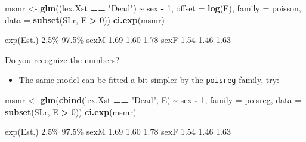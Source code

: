 \documentclass[
]{book}
\newenvironment{Shaded}{\begin{snugshade}}{\end{snugshade}}
\newcommand{\AttributeTok}[1]{\textcolor[rgb]{0.13,0.29,0.53}{#1}}
\newcommand{\DecValTok}[1]{\textcolor[rgb]{0.00,0.00,0.81}{#1}}
\newcommand{\FunctionTok}[1]{\textcolor[rgb]{0.13,0.29,0.53}{\textbf{#1}}}
\newcommand{\NormalTok}[1]{#1}
\newcommand{\OtherTok}[1]{\textcolor[rgb]{0.56,0.35,0.01}{#1}}
\newcommand{\SpecialCharTok}[1]{\textcolor[rgb]{0.81,0.36,0.00}{\textbf{#1}}}
\newcommand{\StringTok}[1]{\textcolor[rgb]{0.31,0.60,0.02}{#1}}
\providecommand{\tightlist}{%
  \setlength{\itemsep}{0pt}\setlength{\parskip}{0pt}}
\begin{document}
\begin{enumerate}
\begin{Shaded}
\begin{Highlighting}[]
\NormalTok{msmr }\OtherTok{\textless{}{-}} \FunctionTok{glm}\NormalTok{((lex.Xst }\SpecialCharTok{==} \StringTok{"Dead"}\NormalTok{) }\SpecialCharTok{\textasciitilde{}}\NormalTok{ sex }\SpecialCharTok{{-}} \DecValTok{1}\NormalTok{,}
            \AttributeTok{offset =} \FunctionTok{log}\NormalTok{(E),}
            \AttributeTok{family =}\NormalTok{ poisson,}
              \AttributeTok{data =} \FunctionTok{subset}\NormalTok{(SLr, E }\SpecialCharTok{\textgreater{}} \DecValTok{0}\NormalTok{))}
\FunctionTok{ci.exp}\NormalTok{(msmr)}
\end{Highlighting}
\end{Shaded}

\begin{Shaded}
\begin{Highlighting}[]
\NormalTok{     exp(Est.) 2.5\% 97.5\%}
\NormalTok{sexM      1.69 1.60  1.78}
\NormalTok{sexF      1.54 1.46  1.63}
\end{Highlighting}
\end{Shaded}

  Do you recognize the numbers?

  \begin{itemize}
  \tightlist
  \item
    The same model can be fitted a bit simpler by the \texttt{poisreg} family, try:
  \end{itemize}

\begin{Shaded}
\begin{Highlighting}[]
\NormalTok{msmr }\OtherTok{\textless{}{-}} \FunctionTok{glm}\NormalTok{(}\FunctionTok{cbind}\NormalTok{(lex.Xst }\SpecialCharTok{==} \StringTok{"Dead"}\NormalTok{, E) }\SpecialCharTok{\textasciitilde{}}\NormalTok{ sex }\SpecialCharTok{{-}} \DecValTok{1}\NormalTok{, }
            \AttributeTok{family =}\NormalTok{ poisreg,}
              \AttributeTok{data =} \FunctionTok{subset}\NormalTok{(SLr, E }\SpecialCharTok{\textgreater{}} \DecValTok{0}\NormalTok{))}
\FunctionTok{ci.exp}\NormalTok{(msmr)}
\end{Highlighting}
\end{Shaded}

\begin{Shaded}
\begin{Highlighting}[]
\NormalTok{     exp(Est.) 2.5\% 97.5\%}
\NormalTok{sexM      1.69 1.60  1.78}
\NormalTok{sexF      1.54 1.46  1.63}
\end{Highlighting}
\end{Shaded}


\end{enumerate}
\end{document}
